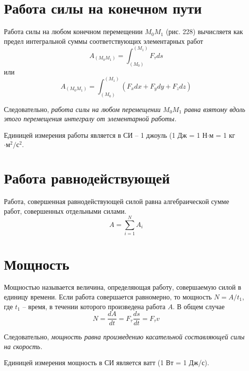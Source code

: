 \section{Работа силы на конечном пути}
Работа силы на любом конечном перемещении \( M_0 M_1 \) (рис. 228) 
вычисляетя как предел интегральной суммы соответствующих элементарных 
работ 
\[ A_{(M_0 M_1)} = \int_{(M_0)}^{(M_1)} F_\tau ds \]
или 
\[ 
    A_{(M_0 M_1)} = \int_{(M_0)}^{(M_1)} 
    \left( F_x dx + F_y dy + F_z dz \right)
\]

Следовательно, \emph{работа силы на любом перемещении \( M_0 M_1 \) равна 
взятому вдоль этого перемещения интегралу от элементарной работы.}

Единицей измерения работы является в СИ -- 1 джоуль 
(1 Дж = 1 Н\( \cdot \)м = 1 кг \( \cdot\text{м}^2/\text{с}^2 \).

\section{Работа равнодействующей}
Работа, совершенная равнодействующей силой равна алгебраической сумме 
работ, совершенных отдельными силами.
\[ A = \sum_{i=1}^{N} A_i \]

\section{Мощность}
Мощностью называется величина, определяющая работу, совершаемую силой 
в единицу времени. Если работа совершается равномерно, то мощность 
\( N = A/t_1 \), где \( t_1 \) -- время, в течении которого произведена 
работа \( A \). В общем случае
\[ N = \frac{dA}{dt} = F_\tau \frac{ds}{dt} = F_\tau v \]

Следовательно, \emph{мощность равна произведению касательной 
составляющей силы на скорость.}

Единицей измерения мощность в СИ является ватт (1 Вт = 1 Дж/с).

\newpage
